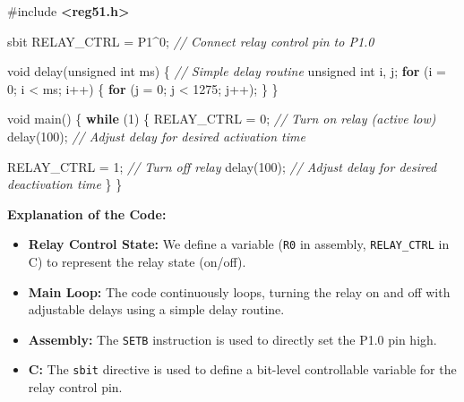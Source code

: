 \documentclass[
]{article}
\newenvironment{Shaded}{}{}
\newcommand{\CommentTok}[1]{\textcolor[rgb]{0.38,0.63,0.69}{\textit{#1}}}
\newcommand{\ControlFlowTok}[1]{\textcolor[rgb]{0.00,0.44,0.13}{\textbf{#1}}}
\newcommand{\DataTypeTok}[1]{\textcolor[rgb]{0.56,0.13,0.00}{#1}}
\newcommand{\DecValTok}[1]{\textcolor[rgb]{0.25,0.63,0.44}{#1}}
\newcommand{\ImportTok}[1]{\textcolor[rgb]{0.00,0.50,0.00}{\textbf{#1}}}
\newcommand{\NormalTok}[1]{#1}
\newcommand{\OperatorTok}[1]{\textcolor[rgb]{0.40,0.40,0.40}{#1}}
\newcommand{\PreprocessorTok}[1]{\textcolor[rgb]{0.74,0.48,0.00}{#1}}
\begin{document}
\begin{Shaded}
\begin{Highlighting}[]
\PreprocessorTok{\#include }\ImportTok{\textless{}reg51.h\textgreater{}}

\NormalTok{sbit RELAY\_CTRL }\OperatorTok{=}\NormalTok{ P1}\OperatorTok{\^{}}\DecValTok{0}\OperatorTok{;}  \CommentTok{// Connect relay control pin to P1.0}

\DataTypeTok{void}\NormalTok{ delay}\OperatorTok{(}\DataTypeTok{unsigned} \DataTypeTok{int}\NormalTok{ ms}\OperatorTok{)} \OperatorTok{\{} \CommentTok{// Simple delay routine}
    \DataTypeTok{unsigned} \DataTypeTok{int}\NormalTok{ i}\OperatorTok{,}\NormalTok{ j}\OperatorTok{;}
    \ControlFlowTok{for} \OperatorTok{(}\NormalTok{i }\OperatorTok{=} \DecValTok{0}\OperatorTok{;}\NormalTok{ i }\OperatorTok{\textless{}}\NormalTok{ ms}\OperatorTok{;}\NormalTok{ i}\OperatorTok{++)} \OperatorTok{\{}
        \ControlFlowTok{for} \OperatorTok{(}\NormalTok{j }\OperatorTok{=} \DecValTok{0}\OperatorTok{;}\NormalTok{ j }\OperatorTok{\textless{}} \DecValTok{1275}\OperatorTok{;}\NormalTok{ j}\OperatorTok{++);}
    \OperatorTok{\}}
\OperatorTok{\}}

\DataTypeTok{void}\NormalTok{ main}\OperatorTok{()} \OperatorTok{\{}
    \ControlFlowTok{while} \OperatorTok{(}\DecValTok{1}\OperatorTok{)} \OperatorTok{\{}
\NormalTok{        RELAY\_CTRL }\OperatorTok{=} \DecValTok{0}\OperatorTok{;}  \CommentTok{// Turn on relay (active low)}
\NormalTok{        delay}\OperatorTok{(}\DecValTok{100}\OperatorTok{);}      \CommentTok{// Adjust delay for desired activation time}

\NormalTok{        RELAY\_CTRL }\OperatorTok{=} \DecValTok{1}\OperatorTok{;}  \CommentTok{// Turn off relay}
\NormalTok{        delay}\OperatorTok{(}\DecValTok{100}\OperatorTok{);}      \CommentTok{// Adjust delay for desired deactivation time}
    \OperatorTok{\}}
\OperatorTok{\}}
\end{Highlighting}
\end{Shaded}

\textbf{Explanation of the Code:}

\begin{itemize}
\item
  \textbf{Relay Control State:} We define a variable (\texttt{R0} in
  assembly, \texttt{RELAY\_CTRL} in C) to represent the relay state
  (on/off).
\item
  \textbf{Main Loop:} The code continuously loops, turning the relay on
  and off with adjustable delays using a simple delay routine.
\item
  \textbf{Assembly:} The \texttt{SETB} instruction is used to directly
  set the P1.0 pin high.
\item
  \textbf{C:} The \texttt{sbit} directive is used to define a bit-level
  controllable variable for the relay control pin.
\end{itemize}
\end{document}
